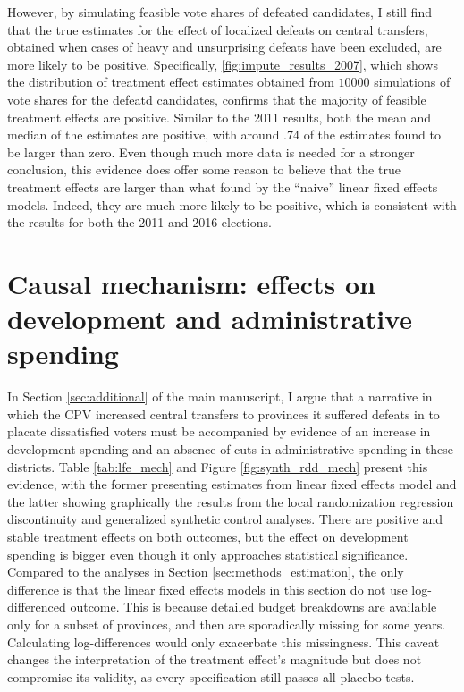 \documentclass[12pt]{article}
\newcommand{\1}{\mathbbm{1}}
\begin{document}
However, by simulating feasible vote shares of defeated candidates, I still find that the true estimates for the effect of localized defeats on central transfers, obtained when cases of heavy and unsurprising defeats have been excluded, are more likely to be positive. Specifically, \autoref{fig:impute_results_2007}, which shows the distribution of treatment effect estimates obtained from $10000$ simulations of vote shares for the defeatd candidates, confirms that the majority of feasible treatment effects are positive. Similar to the 2011 results, both the mean and median of the estimates are positive, with around .74 of the estimates found to be larger than zero. Even though much more data is needed for a stronger conclusion, this evidence does offer some reason to believe that the true treatment effects are larger than what found by the ``naive'' linear fixed effects models. Indeed, they are much more likely to be positive, which is consistent with the results for both the 2011 and 2016 elections.

\clearpage

\section{Causal mechanism: effects on development and administrative spending}
\label{app:mechanisms}

In Section \ref{sec:additional} of the main manuscript, I argue that a narrative in which the CPV increased central transfers to provinces it suffered defeats in to placate dissatisfied voters must be accompanied by evidence of an increase in development spending and an absence of cuts in administrative spending in these districts. Table \ref{tab:lfe_mech} and Figure \ref{fig:synth_rdd_mech} present this evidence, with the former presenting estimates from linear fixed effects model and the latter showing graphically the results from the local randomization regression discontinuity and generalized synthetic control analyses. There are positive and stable treatment effects on both outcomes, but the effect on development spending is bigger even though it only approaches statistical significance. Compared to the analyses in Section \ref{sec:methods_estimation}, the only difference is that the linear fixed effects models in this section do not use log-differenced outcome. This is because detailed budget breakdowns are available only for a subset of provinces, and then are sporadically missing for some years. Calculating log-differences would only exacerbate this missingness. This caveat changes the interpretation of the treatment effect's magnitude but does not compromise its validity, as every specification still passes all placebo tests.
\end{document}
